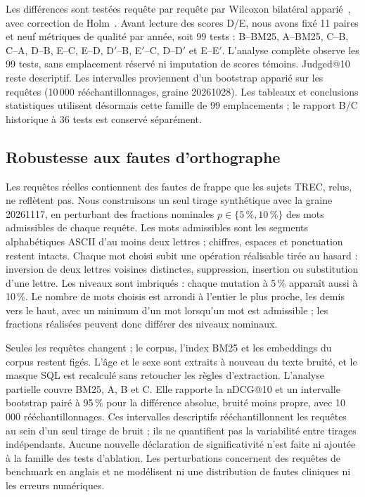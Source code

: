\documentclass{article}
\begin{document}
Les différences sont testées requête par requête par Wilcoxon bilatéral apparié~\citep{wilcoxon1945}, avec correction de Holm~\citep{holm1979}. Avant lecture des scores D/E, nous avons fixé 11 paires et neuf métriques de qualité par année, soit 99 tests : B--BM25, A--BM25, C--B, C--A, D--B, E--C, E--D, D$'$--B, E$'$--C, D--D$'$ et E--E$'$. L'analyse complète observe les 99 tests, sans emplacement réservé ni imputation de scores témoins. Judged@10 reste descriptif. Les intervalles proviennent d'un bootstrap apparié sur les requêtes (10\,000 rééchantillonnages, graine 20261028). Les tableaux et conclusions statistiques utilisent désormais cette famille de 99 emplacements ; le rapport B/C historique à 36 tests est conservé séparément.

\subsection{Robustesse aux fautes d'orthographe}

Les requêtes réelles contiennent des fautes de frappe que les sujets TREC, relus, ne reflètent pas. Nous construisons un seul tirage synthétique avec la graine 20261117, en perturbant des fractions nominales $p \in \{5\,\%, 10\,\%\}$ des mots admissibles de chaque requête. Les mots admissibles sont les segments alphabétiques ASCII d'au moins deux lettres ; chiffres, espaces et ponctuation restent intacts. Chaque mot choisi subit une opération réalisable tirée au hasard : inversion de deux lettres voisines distinctes, suppression, insertion ou substitution d'une lettre. Les niveaux sont imbriqués : chaque mutation à 5\,\% apparaît aussi à 10\,\%. Le nombre de mots choisis est arrondi à l'entier le plus proche, les demis vers le haut, avec un minimum d'un mot lorsqu'un mot est admissible ; les fractions réalisées peuvent donc différer des niveaux nominaux.

Seules les requêtes changent ; le corpus, l'index BM25 et les embeddings du corpus restent figés. L'âge et le sexe sont extraits à nouveau du texte bruité, et le masque SQL est recalculé sans retoucher les règles d'extraction. L'analyse partielle couvre BM25, A, B et C. Elle rapporte la nDCG@10 et un intervalle bootstrap pairé à 95\,\% pour la différence absolue, bruité moins propre, avec 10\,000 rééchantillonnages. Ces intervalles descriptifs rééchantillonnent les requêtes au sein d'un seul tirage de bruit ; ils ne quantifient pas la variabilité entre tirages indépendants. Aucune nouvelle déclaration de significativité n'est faite ni ajoutée à la famille des tests d'ablation. Les perturbations concernent des requêtes de benchmark en anglais et ne modélisent ni une distribution de fautes cliniques ni les erreurs numériques.
\end{document}

